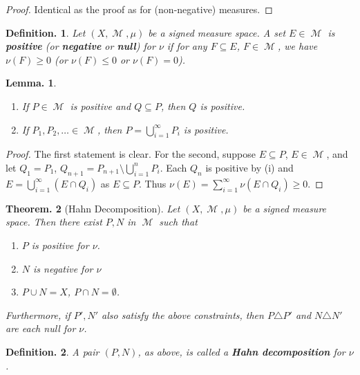 \documentclass[11pt, a4paper]{memoir}
\theoremstyle{change}
\newtheorem{theorem}{Theorem.}[section]
\newtheorem{lemma}[theorem]{Lemma.}
\theoremstyle{plain}
\theoremstyle{nonumberplain}
\newtheorem{definition}{Definition.}
\newtheorem{proof}{Proof}
\DeclareMathOperator{\M}{{\mathcal{M}}}
\numberwithin{equation}{section}
\begin{document}
\begin{proof}
    Identical as the proof as for (non-negative) measures.
\end{proof}
\begin{definition}
    Let $(X,\M,\mu)$ be a signed measure space.
    A set $E\in\M$ is \textbf{positive} (or \textbf{negative} or \textbf{null}) for $\nu$ if for any $F\subseteq E$, $F\in\M$, we have $\nu(F)\geq 0$ (or $\nu(F)\leq 0$ or $\nu(F)=0$).
\end{definition}
\begin{lemma}
    \begin{enumerate}[nolistsep,label=(\roman*)]
        \item If $P\in\M$ is positive and $Q\subseteq P$, then $Q$ is positive.
        \item If $P_1,P_2,\ldots\in\M$, then $P=\bigcup_{i=1}^\infty P_i$ is positive.
    \end{enumerate}
\end{lemma}
\begin{proof}
    The first statement is clear.
    For the second, suppose $E\subseteq P$, $E\in\M$, and let $Q_1=P_1$, $Q_{n+1}=P_{n+1}\setminus\bigcup_{i=1}^n P_i$.
    Each $Q_n$ is positive by (i) and $E=\bigcup_{i=1}^\infty(E\cap Q_i)$ as $E\subseteq P$.
    Thus $\nu(E)=\sum_{i=1}^\infty\nu(E\cap Q_i)\geq 0$.
\end{proof}
\begin{theorem}[Hahn Decomposition]
    Let $(X,\M,\mu)$ be a signed measure space.
    Then there exist $P,N$ in $\M$ such that
    \begin{enumerate}[nolistsep,label=(\roman*)]
        \item $P$ is positive for $\nu$.
        \item $N$ is negative for $\nu$
        \item $P\cup N=X$, $P\cap N=\emptyset$.
    \end{enumerate}
    Furthermore, if $P',N'$ also satisfy the above constraints, then $P\triangle P'$ and $N\triangle N'$ are each null for $\nu$.
\end{theorem}
\begin{definition}
    A pair $(P,N)$, as above, is called a \textbf{Hahn decomposition} for $\nu$.
\end{definition}
\end{document}
